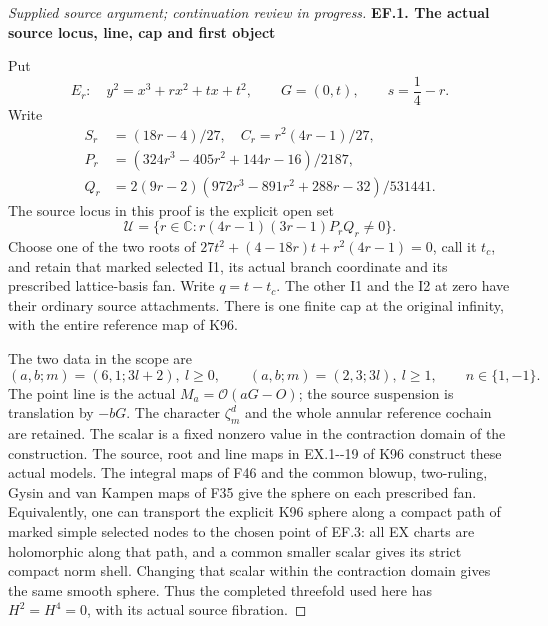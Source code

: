 \begin{proof}[Supplied source argument; continuation review in progress]

\par

\medskip\noindent\textbf{EF.1. The actual source locus, line, cap and first object}

\par\nobreak

Put
\[
 E_r:\quad y^2=x^3+rx^2+tx+t^2,\qquad G=(0,t),\qquad
 s=\frac14-r.
 \tag{EF.1}
\]
Write
\[
 \begin{split}
 S_r&=(18r-4)/27,\quad C_r=r^2(4r-1)/27,\\
 P_r&=(324r^3-405r^2+144r-16)/2187,\\
 Q_r&=2(9r-2)(972r^3-891r^2+288r-32)/531441.
 \end{split}                                                    \tag{EF.2}
\]
The source locus in this proof is the explicit open set
\[
 \mathcal U=\{r\in\mathbb C:
 r(4r-1)(3r-1)P_rQ_r\ne0\}.
 \tag{EF.3}
\]
Choose one of the two roots of
\(27t^2+(4-18r)t+r^2(4r-1)=0\), call it \(t_c\), and retain
that marked selected I1, its actual branch coordinate and its prescribed
lattice-basis fan. Write \(q=t-t_c\). The other I1 and the I2 at zero
have their ordinary source attachments. There is one finite cap at the
original infinity, with the entire reference map of K96.

The two data in the scope are
\[
 (a,b;m)=(6,1;3l+2),\ l\ge0,
 \qquad (a,b;m)=(2,3;3l),\ l\ge1,
 \qquad n\in\{1,-1\}.
 \tag{EF.4}
\]
The point line is the actual \(M_a=\mathcal O(aG-O)\); the source
suspension is translation by \(-bG\). The character \(\zeta_m^d\)
and the whole annular reference cochain are retained. The scalar is a
fixed nonzero value in the contraction domain of the construction. The
source, root and line maps in EX.1-\/-19 of K96 construct these actual
models. The integral maps of F46 and the common blowup, two-ruling,
Gysin and van Kampen maps of F35 give the sphere on each prescribed fan.
Equivalently, one can transport the explicit K96 sphere along a compact
path of marked simple selected nodes to the chosen point of EF.3: all
EX charts are holomorphic along that path, and a common smaller scalar
gives its strict compact norm shell. Changing that scalar within the
contraction domain gives the same smooth sphere. Thus the completed
threefold used here has \(H^2=H^4=0\), with its actual source fibration.


\end{proof}
